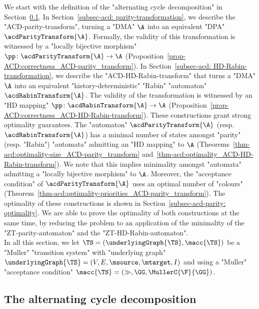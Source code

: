 \documentclass{theoretics}
\begin{document}
We start with the definition of the "alternating cycle decomposition" in Section~\ref{subsec-acd: acd-definition}. In Section~\ref{subsec-acd: parity-transformation}, we describe the "ACD-parity-transform", turning a "DMA" $\A$ into an equivalent "DPA" $\acdParityTransform{\A}$. Formally, the validity of this transformation is witnessed by a "locally bijective morphism" $\pp\colon \acdParityTransform{\A}\to \A$ (Proposition~\ref{prop-ACD:correctness_ACD-parity_transform}).
In Section~\ref{subsec-acd: HD-Rabin-transformation}, we describe the "ACD-HD-Rabin-transform" that turns a "DMA" $\A$ into an equivalent "history-deterministic" "Rabin" "automaton" $\acdRabinTransform{\A}$. The validity of the transformation is witnessed by an "HD mapping" $\pp\colon \acdRabinTransform{\A}\to \A$ (Proposition~\ref{prop-ACD:correctness_ACD-HD-Rabin-transform}).
These constructions grant strong optimality guarantees. The "automaton" $\acdParityTransform{\A}$ (resp. $\acdRabinTransform{\A}$) has a minimal number of states amongst "parity" (resp. "Rabin") "automata" admitting an "HD mapping" to $\A$ (Theorems~\ref{thm-acd:optimality-size_ACD-parity_transform} and~\ref{thm-acd:optimality_ACD-HD-Rabin-transform}). We note that this implies minimality amongst "automata" admitting a "locally bijective morphism" to $\A$.
Moreover, the "acceptance condition" of $\acdParityTransform{\A}$ uses an optimal number of "colours" (Theorem~\ref{thm-acd:optimality-priorities_ACD-parity_transform}).
The optimality of these constructions is shown in Section~\ref{subsec-acd-parity: optimality}. We are able to prove the optimality of both constructions at the same time, by reducing the problem to an application of the minimality of the "ZT-parity-automaton" and the "ZT-HD-Rabin-automaton".\\


In all this section, we let $\TS = (\underlyingGraph{\TS}, \macc{\TS})$ be a "Muller" "transition system" with "underlying graph"  $\underlyingGraph{\TS} =(V ,E , \msource , \mtarget, I)$ and using a "Muller" "acceptance condition" $\macc{\TS} = (\gg, \GG, \MullerC{\F}{\GG})$.

\subsection{The alternating cycle decomposition}\label{subsec-acd: acd-definition}
\end{document}
